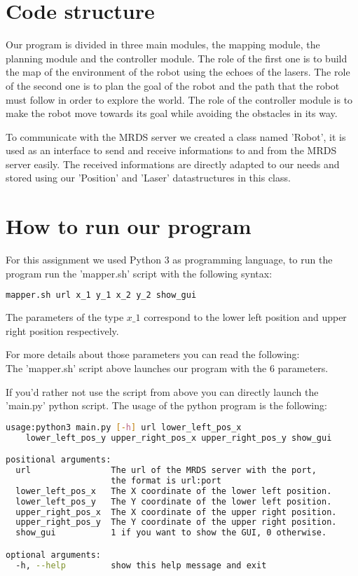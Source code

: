 \section{Code structure}

Our program is divided in three main modules, the mapping module, the planning module and the controller module.
The role of the first one is to build the map of the environment of the robot using the echoes of the lasers.
The role of the second one is to plan the goal of the robot and the path that the robot must follow in order to explore the world.
The role of the controller module is to make the robot move towards its goal while avoiding the obstacles in its way.

To communicate with the MRDS server we created a class named 'Robot', it is used as an interface to send and receive informations to and from the MRDS server easily.
The received informations are directly adapted to our needs and stored using our 'Position' and 'Laser' datastructures in this class.

\section{How to run our program}

For this assignment we used Python 3 as programming language, to run the program run the 'mapper.sh' script with the following syntax:
\\
\begin{lstlisting}[language=bash, basicstyle=\small]
mapper.sh url x_1 y_1 x_2 y_2 show_gui
\end{lstlisting}

The parameters of the type $x\_1$ correspond to the lower left position and upper right position respectively.

For more details about those parameters you can read the following:
\\
The 'mapper.sh' script above launches our program with the 6 parameters.

If you'd rather not use the script from above you can directly launch the 'main.py' python script.
The usage of the python program is the following:
\\
\begin{lstlisting}[language=bash, basicstyle=\small]
usage:python3 main.py [-h] url lower_left_pos_x 
    lower_left_pos_y upper_right_pos_x upper_right_pos_y show_gui

positional arguments:
  url                The url of the MRDS server with the port, 
                     the format is url:port
  lower_left_pos_x   The X coordinate of the lower left position.
  lower_left_pos_y   The Y coordinate of the lower left position.
  upper_right_pos_x  The X coordinate of the upper right position.
  upper_right_pos_y  The Y coordinate of the upper right position.
  show_gui           1 if you want to show the GUI, 0 otherwise.

optional arguments:
  -h, --help         show this help message and exit
\end{lstlisting}
